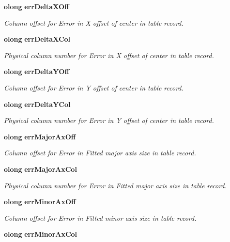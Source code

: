 \begin{CompactItemize}
{\bf olong} {\bf err\-Delta\-XOff}
\begin{CompactList}\small\item\em Column offset for Error in X offset of center in table record. \item\end{CompactList}\item 
{\bf olong} {\bf err\-Delta\-XCol}
\begin{CompactList}\small\item\em Physical column number for Error in X offset of center in table record. \item\end{CompactList}\item 
{\bf olong} {\bf err\-Delta\-YOff}
\begin{CompactList}\small\item\em Column offset for Error in Y offset of center in table record. \item\end{CompactList}\item 
{\bf olong} {\bf err\-Delta\-YCol}
\begin{CompactList}\small\item\em Physical column number for Error in Y offset of center in table record. \item\end{CompactList}\item 
{\bf olong} {\bf err\-Major\-Ax\-Off}
\begin{CompactList}\small\item\em Column offset for Error in Fitted major axis size in table record. \item\end{CompactList}\item 
{\bf olong} {\bf err\-Major\-Ax\-Col}
\begin{CompactList}\small\item\em Physical column number for Error in Fitted major axis size in table record. \item\end{CompactList}\item 
{\bf olong} {\bf err\-Minor\-Ax\-Off}
\begin{CompactList}\small\item\em Column offset for Error in Fitted minor axis size in table record. \item\end{CompactList}\item 
{\bf olong} {\bf err\-Minor\-Ax\-Col}

\end{CompactItemize}
